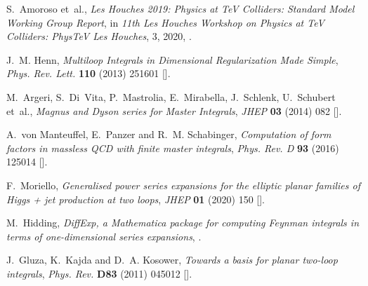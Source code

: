 \documentclass[11pt,a4paper,DIV=11,numbers=noenddot,parskip=half]{scrartcl}
\begin{document}



\providecommand{\href}[2]{#2}\begingroup\raggedright\begin{thebibliography}{10}

S.~Amoroso et~al., \emph{{Les Houches 2019: Physics at TeV Colliders: Standard
  Model Working Group Report}},  in \emph{{11th Les Houches Workshop on Physics
  at TeV Colliders}: {PhysTeV Les Houches}}, 3, 2020,
  \href{https://arxiv.org/abs/2003.01700}{{}}.

J.~M. Henn, \emph{{Multiloop Integrals in Dimensional Regularization Made
  Simple}}, \href{https://doi.org/10.1103/PhysRevLett.110.251601}{\emph{Phys.
  Rev. Lett.} {\bfseries 110} (2013) 251601}
  [\href{https://arxiv.org/abs/1304.1806}{{}}].

M.~Argeri, S.~Di~Vita, P.~Mastrolia, E.~Mirabella, J.~Schlenk, U.~Schubert
  et~al., \emph{{Magnus and Dyson series for Master Integrals}},
  \href{https://doi.org/10.1007/JHEP03(2014)082}{\emph{JHEP} {\bfseries 03}
  (2014) 082} [\href{https://arxiv.org/abs/1401.2979}{{}}].

A.~von Manteuffel, E.~Panzer and R.~M. Schabinger, \emph{{Computation of form
  factors in massless QCD with finite master integrals}},
  \href{https://doi.org/10.1103/PhysRevD.93.125014}{\emph{Phys. Rev. D}
  {\bfseries 93} (2016) 125014}
  [\href{https://arxiv.org/abs/1510.06758}{{}}].

F.~Moriello, \emph{{Generalised power series expansions for the elliptic planar
  families of Higgs + jet production at two loops}},
  \href{https://doi.org/10.1007/JHEP01(2020)150}{\emph{JHEP} {\bfseries 01}
  (2020) 150} [\href{https://arxiv.org/abs/1907.13234}{{}}].

M.~Hidding, \emph{{DiffExp, a Mathematica package for computing Feynman
  integrals in terms of one-dimensional series expansions}},
  \href{https://arxiv.org/abs/2006.05510}{{}}.

J.~Gluza, K.~Kajda and D.~A. Kosower, \emph{{Towards a basis for planar
  two-loop integrals}},
  \href{https://doi.org/10.1103/PhysRevD.83.045012}{\emph{Phys. Rev.}
  {\bfseries D83} (2011) 045012}
  [\href{https://arxiv.org/abs/1009.0472}{{}}].


\end{thebibliography}
\end{document}
